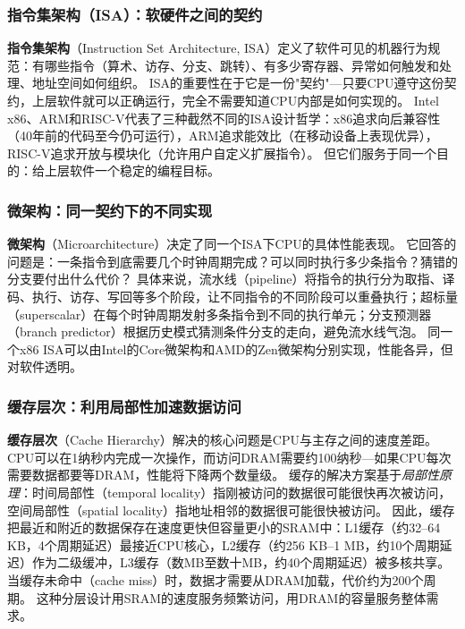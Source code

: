 \subsubsection{指令集架构（ISA）：软硬件之间的契约}

\textbf{指令集架构}（Instruction Set Architecture, ISA）定义了软件可见的机器行为规范：有哪些指令（算术、访存、分支、跳转）、有多少寄存器、异常如何触发和处理、地址空间如何组织。
ISA的重要性在于它是一份"契约"---只要CPU遵守这份契约，上层软件就可以正确运行，完全不需要知道CPU内部是如何实现的。
Intel x86、ARM和RISC-V代表了三种截然不同的ISA设计哲学\cite{intel_sdm_2026,riscv_spec_2026}：x86追求向后兼容性（40年前的代码至今仍可运行），ARM追求能效比（在移动设备上表现优异），RISC-V追求开放与模块化（允许用户自定义扩展指令）。
但它们服务于同一个目的：给上层软件一个稳定的编程目标。

\subsubsection{微架构：同一契约下的不同实现}

\textbf{微架构}（Microarchitecture）决定了同一个ISA下CPU的具体性能表现。
它回答的问题是：一条指令到底需要几个时钟周期完成？可以同时执行多少条指令？猜错的分支要付出什么代价？
具体来说，流水线（pipeline）将指令的执行分为取指、译码、执行、访存、写回等多个阶段，让不同指令的不同阶段可以重叠执行；超标量（superscalar）在每个时钟周期发射多条指令到不同的执行单元；分支预测器（branch predictor）根据历史模式猜测条件分支的走向，避免流水线气泡。
同一个x86 ISA可以由Intel的Core微架构和AMD的Zen微架构分别实现，性能各异，但对软件透明。

\subsubsection{缓存层次：利用局部性加速数据访问}

\textbf{缓存层次}（Cache Hierarchy）解决的核心问题是CPU与主存之间的速度差距。
CPU可以在1纳秒内完成一次操作，而访问DRAM需要约100纳秒---如果CPU每次需要数据都要等DRAM，性能将下降两个数量级。
缓存的解决方案基于\emph{局部性原理}：时间局部性（temporal locality）指刚被访问的数据很可能很快再次被访问，空间局部性（spatial locality）指地址相邻的数据很可能很快被访问\cite{drepper2007memory}。
因此，缓存把最近和附近的数据保存在速度更快但容量更小的SRAM中：L1缓存（约32--64 KB，4个周期延迟）最接近CPU核心，L2缓存（约256 KB--1 MB，约10个周期延迟）作为二级缓冲，L3缓存（数MB至数十MB，约40个周期延迟）被多核共享。
当缓存未命中（cache miss）时，数据才需要从DRAM加载，代价约为200个周期。
这种分层设计用SRAM的速度服务频繁访问，用DRAM的容量服务整体需求。

